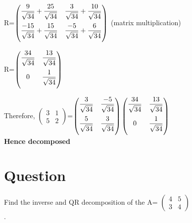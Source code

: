 \documentclass[a4paper,12pt]{article}
\begin{document}
\vspace{0.5cm}

R=$\begin{pmatrix} \dfrac{9}{\sqrt{34}}+\dfrac{25}{\sqrt{34}} \vspace*{2mm} & \dfrac{3}{\sqrt{34}}+\dfrac{10}{\sqrt{34}} \\ \dfrac{-15}{\sqrt{34}}+\dfrac{15}{\sqrt{34}} \vspace*{2mm} & \dfrac{-5}{\sqrt{34}}+\dfrac{6}{\sqrt{34}} \end{pmatrix}$  \hspace*{3cm}(matrix multiplication)\\

\vspace{0.5cm}

R=$\begin{pmatrix} \dfrac{34}{\sqrt{34}} \vspace*{2mm} & \dfrac{13}{\sqrt{34}} \\ 0 \vspace*{2mm} & \dfrac{1}{\sqrt{34}} \end{pmatrix}$\\

\vspace{0.5cm}

Therefore, {\huge $\begin{pmatrix} 3 & 1  \\ 5 & 2 \end{pmatrix}$}=$\begin{pmatrix} \dfrac{3}{\sqrt{34}} \vspace*{2mm} & \dfrac{-5}{\sqrt{34}} \\ \dfrac{5}{\sqrt{34}} \vspace*{2mm} & \dfrac{3}{\sqrt{34}} \end{pmatrix}$$\begin{pmatrix} \dfrac{34}{\sqrt{34}} \vspace*{2mm} & \dfrac{13}{\sqrt{34}} \\ 0 \vspace*{2mm} & \dfrac{1}{\sqrt{34}} \end{pmatrix}$\\

\textbf{Hence decomposed}
         
\pagebreak

\section*{\small Question}
Find the inverse and QR decomposition of the A= $\begin{pmatrix} 4 & 5  \\ 3 & 4 \end{pmatrix}$\\.
\end{document}

